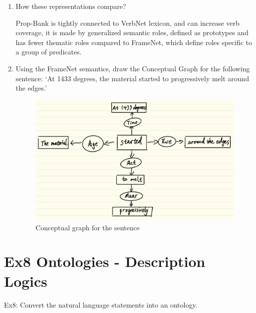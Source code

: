 \documentclass[12pt]{article}
\begin{document}
{\begin{enumerate}[1.]
\begin{enumerate}[(1)]
			$melt: KNEAD-26.5, OTHER\_COS-45.4-1$

			$oxidize: ENTITY\_SPECIFIC\_COS-45.5, OTHER\_COS-45.4$
		\item Prop-Bank: 
		
			$melt: MELT.v$

			$oxidize: OXIDIZE.v$
		\item FrameNet:
		
			$melt: CAUSE\_CHANGE\_OF\_PHASE, CHANGE\_OF\_PHASE$

			$oxidize: CORRODING\_CAUSED$
	\end{enumerate}
	\item How these representations compare?
	
	Prop-Bank is tightly connected to VerbNet lexicon, and can increase verb coverage, it 
	is made by generalized semantic roles, defined as prototypes and has fewer thematic roles 
	compared to FrameNet, which define roles specific to a group of predicates.
	\item Using the FrameNet semantics, draw the Conceptual Graph for the following sentence:  
	‘At 1433 degrees, the material started to progressively melt around the edges.’
	\begin{figure}[ht]
		\centering
		\includegraphics[scale=0.18]{figs/conceptual_graph.jpg}
		\caption{Conceptual graph for the sentence}
		\label{fig:label8}
	\end{figure}
\end{enumerate}

\newpage
\section{Ex8 Ontologies - Description Logics}
\label{sec: ex8}
Ex8: Convert the natural language statements into an ontology.

}
\end{document}
